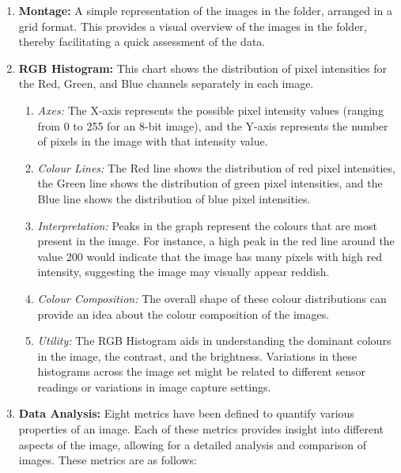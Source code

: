 \begin{enumerate}
    \item \textbf{Montage:} A simple representation of the images in the folder, arranged in a grid format. This provides a visual overview of the images in the folder, thereby facilitating a quick assessment of the data.
    \item \textbf{RGB Histogram:} This chart shows the distribution of pixel intensities for the Red, Green, and Blue channels separately in each image.
          \begin{enumerate}

              \item \textit{Axes:} The X-axis represents the possible pixel intensity values (ranging from 0 to 255 for an 8-bit image), and the Y-axis represents the number of pixels in the image with that intensity value.
              \item \textit{Colour Lines:} The Red line shows the distribution of red pixel intensities, the Green line shows the distribution of green pixel intensities, and the Blue line shows the distribution of blue pixel intensities.
              \item \textit{Interpretation:} Peaks in the graph represent the colours that are most present in the image. For instance, a high peak in the red line around the value 200 would indicate that the image has many pixels with high red intensity, suggesting the image may visually appear reddish.
              \item \textit{Colour Composition:} The overall shape of these colour distributions can provide an idea about the colour composition of the images.
              \item \textit{Utility:} The RGB Histogram aids in understanding the dominant colours in the image, the contrast, and the brightness. Variations in these histograms across the image set might be related to different sensor readings or variations in image capture settings.
          \end{enumerate}
          \newpage
    \item \textbf{Data Analysis:} Eight metrics have been defined to quantify various properties of an image. Each of these metrics provides insight into different aspects of the image, allowing for a detailed analysis and comparison of images. These metrics are as follows:
          \begin{enumerate}


\end{enumerate}
\end{enumerate}

